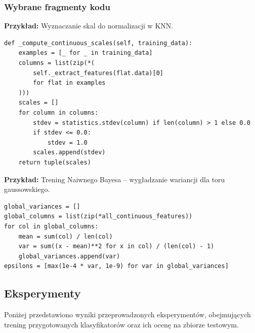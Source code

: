 \documentclass[12pt,a4paper]{article}
\begin{document}
	\subsubsection*{Wybrane fragmenty kodu}

	\textbf{Przykład:} Wyznaczanie skal do normalizacji w KNN.
	\begin{lstlisting}[caption=Obliczanie skal normalizacyjnych (knn.py)]
def _compute_continuous_scales(self, training_data):
    examples = [_ for _ in training_data]
    columns = list(zip(*(
        self._extract_features(flat.data)[0]
        for flat in examples
    )))
    scales = []
    for column in columns:
        stdev = statistics.stdev(column) if len(column) > 1 else 0.0
        if stdev <= 0.0:
            stdev = 1.0
        scales.append(stdev)
    return tuple(scales)
	\end{lstlisting}

	\textbf{Przykład:} Trening Naiwnego Bayesa -- wygładzanie wariancji dla toru gaussowskiego.
	\begin{lstlisting}[caption=Wygładzanie wariancji (naive\_bayes.py)]
global_variances = []
global_columns = list(zip(*all_continuous_features))
for col in global_columns:
    mean = sum(col) / len(col)
    var = sum((x - mean)**2 for x in col) / (len(col) - 1)
    global_variances.append(var)
epsilons = [max(1e-4 * var, 1e-9) for var in global_variances]
	\end{lstlisting}

	\newpage
	\subsection{Eksperymenty}
	Poniżej przedstawiono wyniki przeprowadzonych eksperymentów, obejmujących trening przygotowanych klasyfikatorów oraz ich ocenę na zbiorze testowym.
	
\end{document}
